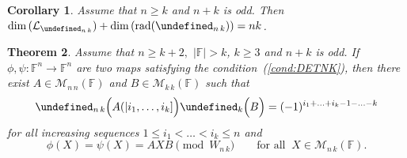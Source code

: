 \documentclass{elsarticle}
\let\det\undefined
\DeclareMathOperator{\det}{det}
\DeclareMathOperator{\rad}{rad}
\def\F{{\mathbb F}}
\def\L{{\mathcal L}}
\def\M{{\mathcal M}}
\newtheorem{theorem}{Theorem}[section]
\newtheorem{corollary}[theorem]{Corollary}
\theoremstyle{definition}
\newtheorem{remark}[theorem]{Remark}
\numberwithin{equation}{section}
\begin{document}
\begin{corollary}\label{cor:NKOddSatCond}Assume that  $n \ge k$  and  $n + k$ is odd. Then $\dim\left(\mathcal L_{\det_{n\,k}}\right) + \dim \left(\rad(\det_{n\,k})\right) = nk$.
\end{corollary}
%



\begin{theorem}\label{thm:homogenphipsiDetNKOdd}Assume that  $n \ge k + 2,$ $|\F| > k$, $k \ge 3$ and  $n + k$ is odd.  If  $\phi, \psi \colon \F^n \to \F^n$ are two maps satisfying the condition~(\ref{cond:DETNK}), then there exist $A \in \M_{n\, n}(\F)$ and $B \in \M_{k\, k}(\F)$ such that
\begin{equation}\label{thm:homogenphipsiDetNKOdd:eqq}
\det_{n\,k} \Bigl(A(|i_1,\ldots, i_k]\Bigr) \det_k \Bigl(B\Bigr) = (-1)^{i_1 + \ldots + i_k - 1 - \ldots - k}
\end{equation}
for all increasing sequences $1 \le i_1 < \ldots < i_k \le n $ and
\begin{equation}\label{thm:homogenphipsiDetNKOdd:eq}
\phi(X) = \psi(X) = AXB \pmod{W_{n\,k}}\qquad\mbox{for all}\;\;X \in \M_{n\,k}(\F).
\end{equation}
\end{theorem} 
\end{document}
